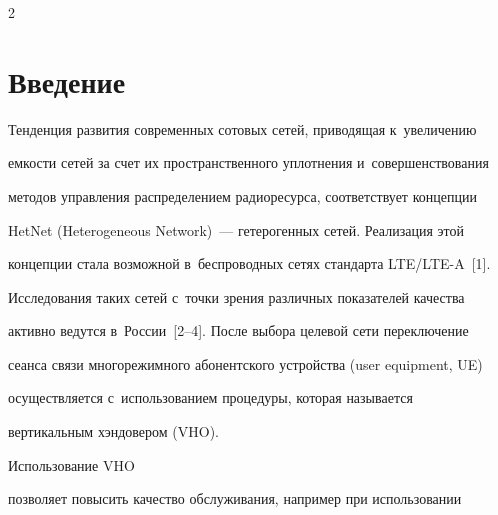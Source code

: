 












\thispagestyle{headings}





\begin{multicols}{2}





\label{st\stat}





\section{Введение}





\vspace*{-2pt}





  Тенденция развития современных сотовых сетей, приводящая к~увеличению 


емкости сетей за счет их пространственного уплотнения и~совершенствования 


методов управления распределением радиоресурса, соответствует концепции 


HetNet (Heterogeneous Network)~--- гетерогенных сетей. Реализация этой 


концепции стала возможной в~беспроводных сетях стандарта LTE/LTE-A~[1]. 


Исследования таких сетей с~точки зрения различных показателей качества 


активно ведутся в~России~[2--4]. После выбора целевой сети переключение 


сеанса связи многорежимного абонентского устройства (user equipment, UE) 


осуществляется с~использованием процедуры, которая называется 


вертикальным хэндовером (VHO). 





Использование VHO 


позволяет повысить качество обслуживания, например при использовании 



\end{multicols}
